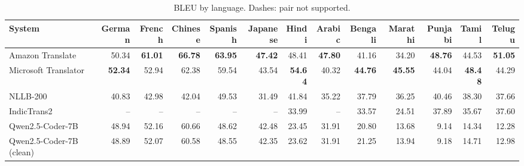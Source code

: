 \begin{table}[t]
\centering
\caption{BLEU by language. Dashes: pair not supported.\label{tab:bleu_lang}}
\begin{tabular}{lrrrrrrrrrrrr}
\toprule
System & German & French & Chinese & Spanish & Japanese & Hindi & Arabic & Bengali & Marathi & Punjabi & Tamil & Telugu \\
\midrule
Amazon Translate & 50.34 & \textbf{61.01} & \textbf{66.78} & \textbf{63.95} & \textbf{47.42} & 48.41 & \textbf{47.80} & 41.16 & 34.20 & \textbf{48.76} & 44.53 & \textbf{51.05} \\
Microsoft Translator & \textbf{52.34} & 52.94 & 62.38 & 59.54 & 43.54 & \textbf{54.64} & 40.32 & \textbf{44.76} & \textbf{45.55} & 44.04 & \textbf{48.48} & 44.29 \\
NLLB-200 & 40.83 & 42.98 & 42.04 & 49.53 & 31.49 & 41.84 & 35.22 & 37.79 & 36.25 & 40.46 & 38.30 & 37.66 \\
IndicTrans2 & -- & -- & -- & -- & -- & 33.99 & -- & 33.57 & 24.51 & 37.89 & 35.67 & 37.60 \\
Qwen2.5-Coder-7B & 48.94 & 52.16 & 60.66 & 48.62 & 42.48 & 23.45 & 31.91 & 20.80 & 13.68 & 9.14 & 14.34 & 12.28 \\
Qwen2.5-Coder-7B (clean) & 48.89 & 52.07 & 60.58 & 48.55 & 42.35 & 23.62 & 31.91 & 21.25 & 13.94 & 9.18 & 14.71 & 12.98 \\
\bottomrule
\end{tabular}
\end{table}
